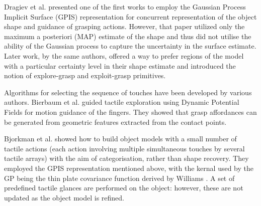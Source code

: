 Dragiev et al. \cite{Dragiev2011Gaussian} presented one of the first works to employ the Gaussian Process Implicit Surface (GPIS) representation for concurrent representation of the object shape and guidance of grasping actions. However, that paper utilized only the maximum a posteriori (MAP) estimate of the shape and thus did not utilise the ability of the Gaussian process to capture the uncertainty in the surface estimate. Later work, by the same authors, \cite{Dragiev2013Uncertainty} offered a way to prefer regions of the model with a particular certainty level in their shape estimate and introduced the notion of explore-grasp and exploit-grasp primitives.

Algorithms for selecting the sequence of touches have been developed by various authors. Bierbaum et al. \cite{Bierbaum2008Potential} guided tactile exploration using Dynamic Potential Fields for motion guidance of the fingers. They showed that grasp affordances can be generated from geometric features extracted from the contact points.

Bjorkman et al. \cite{Bjorkman2013Enhancing} showed how to build object models with a small number of tactile actions (each action involving multiple simultaneous touches by several tactile arrays) with the aim of categorisation, rather than shape recovery. They employed the GPIS representation mentioned above, with the kernal used by the GP being the thin plate covariance function derived by Williams \cite{Williams2007Gaussian}. A set of predefined tactile glances are performed on the object: however, these are not updated as the object model is refined. 


